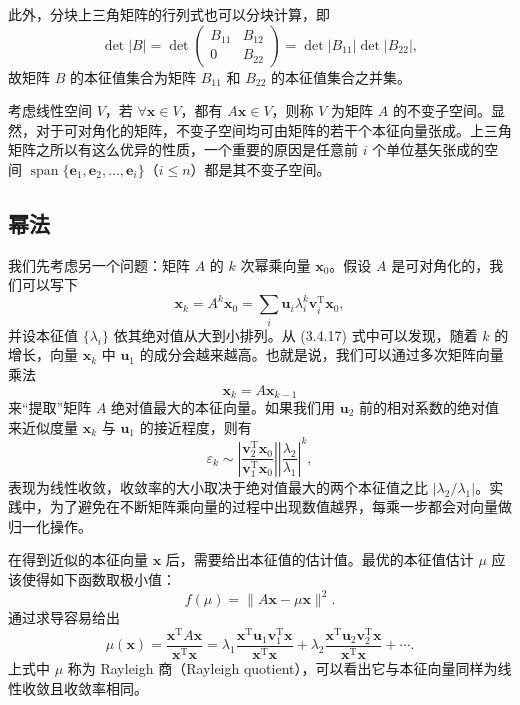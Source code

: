 此外，分块上三角矩阵的行列式也可以分块计算，即
\begin{equation}
\det|B|=\det\begin{pmatrix}B_{11}&B_{12}\\0&B_{22}\end{pmatrix}
=\det|B_{11}|\det|B_{22}|,
\tag{3.4.16}
\end{equation}
故矩阵 $B$ 的本征值集合为矩阵 $B_{11}$ 和 $B_{22}$ 的本征值集合之并集。

考虑线性空间 $V$，若 $\forall\bm x\in V$，都有 $A\bm x\in V$，则称 $V$ 为矩阵 $A$ 的不变子空间。显然，对于可对角化的矩阵，不变子空间均可由矩阵的若干个本征向量张成。上三角矩阵之所以有这么优异的性质，一个重要的原因是任意前 $i$ 个单位基矢张成的空间 $\operatorname{span}\{\bm e_1,\bm e_2,\ldots,\bm e_i\}$（$i\le n$）都是其不变子空间。

\subsection{幂法}

我们先考虑另一个问题：矩阵 $A$ 的 $k$ 次幂乘向量 $\bm x_0$。假设 $A$ 是可对角化的，我们可以写下
\begin{equation}
\bm x_k=A^k\bm x_0=\sum_i \bm u_i\lambda_i^k\bm v_i^{\mathrm T}\bm x_0,
\tag{3.4.17}
\end{equation}
并设本征值 $\{\lambda_i\}$ 依其绝对值从大到小排列。从 (3.4.17) 式中可以发现，随着 $k$ 的增长，向量 $\bm x_k$ 中 $\bm u_1$ 的成分会越来越高。也就是说，我们可以通过多次矩阵向量乘法
\begin{equation}
\bm x_k=A\bm x_{k-1}
\tag{3.4.18}
\end{equation}
来“提取”矩阵 $A$ 绝对值最大的本征向量。如果我们用 $\bm u_2$ 前的相对系数的绝对值来近似度量 $\bm x_k$ 与 $\bm u_1$ 的接近程度，则有
\begin{equation}
\varepsilon_k\sim\left|\frac{\bm v_2^{\mathrm T}\bm x_0}{\bm v_1^{\mathrm T}\bm x_0}\right|
\left|\frac{\lambda_2}{\lambda_1}\right|^k,
\tag{3.4.19}
\end{equation}
表现为线性收敛，收敛率的大小取决于绝对值最大的两个本征值之比 $|\lambda_2/\lambda_1|$。实践中，为了避免在不断矩阵乘向量的过程中出现数值越界，每乘一步都会对向量做归一化操作。

在得到近似的本征向量 $\bm x$ 后，需要给出本征值的估计值。最优的本征值估计 $\mu$ 应该使得如下函数取极小值：
\begin{equation}
f(\mu)=\lVert A\bm x-\mu\bm x\rVert^2.
\tag{3.4.20}
\end{equation}
通过求导容易给出
\begin{equation}
\mu(\bm x)=\frac{\bm x^{\mathrm T}A\bm x}{\bm x^{\mathrm T}\bm x}
=\lambda_1\frac{\bm x^{\mathrm T}\bm u_1\bm v_1^{\mathrm T}\bm x}{\bm x^{\mathrm T}\bm x}
+\lambda_2\frac{\bm x^{\mathrm T}\bm u_2\bm v_2^{\mathrm T}\bm x}{\bm x^{\mathrm T}\bm x}+\cdots.
\tag{3.4.21}
\end{equation}
上式中 $\mu$ 称为 Rayleigh 商（Rayleigh quotient），可以看出它与本征向量同样为线性收敛且收敛率相同。

